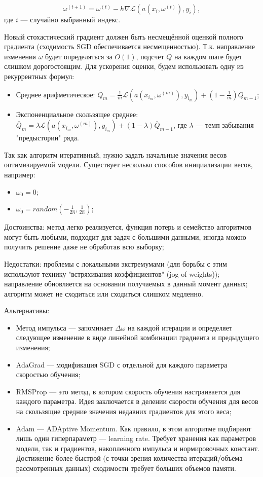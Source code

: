 \documentclass[12pt]{article}
\begin{document}
	$$ \omega^{(t+1)} = \omega^{(t)} - h\nabla \mathcal{L}(a(x_i, \omega^{(t)}), y_i),$$ где $ i $ --- случайно выбранный индекс.
	
	Новый стохастический градиент должен быть несмещённой оценкой полного градиента (сходимость SGD обеспечивается несмещенностью). Т.к. направление изменения $ \omega $ будет определяться за $ O(1) $, подсчет $ Q $ на каждом шаге будет слишком дорогостоящим. Для ускорения оценки, будем использовать одну из рекуррентных формул:
	\begin{itemize}
		\item Среднее арифметическое: $ \overline Q_m = \frac{1}{m}\mathcal{L}(a(x_{i_m}, \omega^{(m)}), y_{i_m}) + (1 - \frac{1}{m}) \overline Q_{m-1}$;
		\item Экспоненциальное скользящее среднее: $ \overline Q_m = \lambda\mathcal{L}(a(x_{i_m}, \omega^{(m)}), y_{i_m}) + (1 - \lambda) \overline Q_{m-1}$, где $ \lambda $ --- темп забывания "предыстории" ряда.
	\end{itemize}
	
	Так как алгоритм итеративный, нужно задать начальные значения весов оптимизируемой модели. Существует несколько способов инициализации весов, например:
	
	\begin{itemize}
		\item $ \omega_0 = 0 $;
		\item $ \omega_0 = random(-\frac{1}{2n}, \frac{1}{2n}) $;
	\end{itemize}
	
	Достоинства: метод легко реализуется, функция потерь и семейство алгоритмов могут быть любыми, подходит для задач с большими данными, иногда можно получить решение даже не обработав всю выборку;
	
	Недостатки: проблемы с локальными экстремумами (для борьбы с этим используют технику "встряхивания коэффициентов" (jog of weights)); направление обновляется на основании получаемых в данный момент данных; алгоритм может не сходиться или сходиться слишком медленно.
	
	Альтернативы:
	\begin{itemize}
		\item Метод импульса --- запоминает $ \Delta\omega $ на каждой итерации и определяет следующее изменение в виде линейной комбинации градиента и предыдущего изменения;
		\item AdaGrad --- модификация SGD с отдельной для каждого параметра скоростью обучения;
		\item RMSProp --- это метод, в котором скорость обучения настраивается для каждого параметра. Идея заключается в делении скорости обучения для весов на скользящие средние значения недавних градиентов для этого веса;
		\item Adam --- ADAptive Momentum. Как правило, в этом алгоритме подбирают лишь один гиперпараметр --- learning rate. Требует хранения как параметров модели, так и градиентов, накопленного импульса и нормировочных констант. Достижение более быстрой (с точки зрения количества итераций/объема рассмотренных данных) сходимости требует больших объемов памяти. 
	\end{itemize}
		
\end{document}
